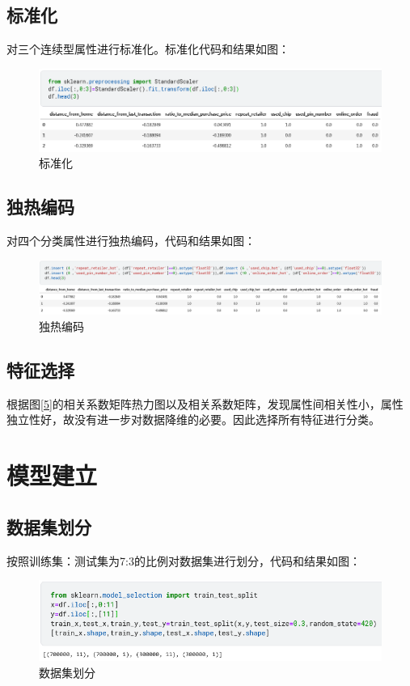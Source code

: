 \subsection{标准化}
对三个连续型属性进行标准化。标准化代码和结果如图：
\begin{figure}[H]
	\centering
	\includegraphics[scale=0.7,angle=0]{images/7.png}
	\caption{标准化}
	\label{7}
\end{figure}

\subsection{独热编码}
对四个分类属性进行独热编码，代码和结果如图：
\begin{figure}[H]
	\centering
	\includegraphics[scale=0.4,angle=0]{images/8.png}
	\caption{独热编码}
	\label{8}
\end{figure}


\subsection{特征选择}
根据图\ref{5}的相关系数矩阵热力图以及相关系数矩阵，发现属性间相关性小，属性独立性好，故没有进一步对数据降维的必要。因此选择所有特征进行分类。


\section{模型建立}
\subsection{数据集划分}
按照训练集：测试集为7:3的比例对数据集进行划分，代码和结果如图：
\begin{figure}[H]
	\centering
	\includegraphics[scale=0.75,angle=0]{images/9.png}
	\caption{数据集划分}
	\label{9}
\end{figure}

